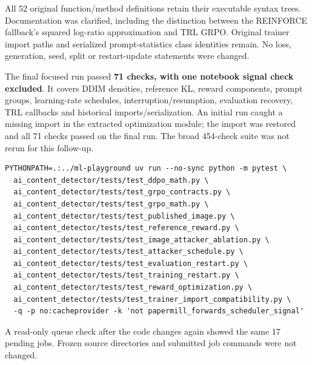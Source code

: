All 52 original function/method definitions retain their executable
syntax trees. Documentation was clarified, including the distinction
between the REINFORCE fallback's squared log-ratio approximation and TRL
GRPO. Original trainer import paths and serialized prompt-statistics
class identities remain. No loss, generation, seed, split or
restart-update statements were changed.

The final focused run passed \textbf{71 checks, with one notebook signal
check excluded}. It covers DDIM densities, reference KL, reward
components, prompt groups, learning-rate schedules,
interruption/resumption, evaluation recovery, TRL callbacks and
historical imports/serialization. An initial run caught a missing
\texttt{} import in the extracted optimization module;
the import was restored and all 71 checks passed on the final run. The
broad 454-check suite was not rerun for this follow-up.

\begin{Verbatim}
PYTHONPATH=.:../ml-playground uv run --no-sync python -m pytest \
  ai_content_detector/tests/test_ddpo_math.py \
  ai_content_detector/tests/test_grpo_contracts.py \
  ai_content_detector/tests/test_grpo_math.py \
  ai_content_detector/tests/test_published_image.py \
  ai_content_detector/tests/test_reference_reward.py \
  ai_content_detector/tests/test_image_attacker_ablation.py \
  ai_content_detector/tests/test_attacker_schedule.py \
  ai_content_detector/tests/test_evaluation_restart.py \
  ai_content_detector/tests/test_training_restart.py \
  ai_content_detector/tests/test_reward_optimization.py \
  ai_content_detector/tests/test_trainer_import_compatibility.py \
  -q -p no:cacheprovider -k 'not papermill_forwards_scheduler_signal'
\end{Verbatim}

A read-only queue check after the code changes again showed the same 17
pending jobs. Frozen source directories and submitted job commands were
not changed.
